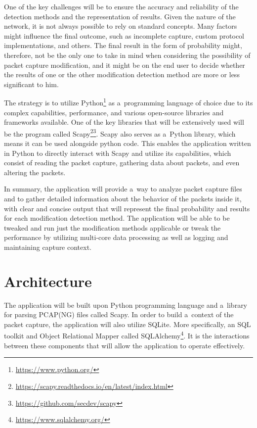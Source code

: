 \documentclass[
  printed,     %
  color,       %
  oneside,     %
  nosansbold,  %
  nocolorbold, %
  nolof,         %
  nolot,         %
]{fithesis4}
\begin{document}
One of the key challenges will be to ensure the accuracy and reliability of the detection methods and the representation of results. Given the nature of the network, it is not always possible to rely on standard concepts. Many factors might influence the final outcome, such as incomplete capture, custom protocol implementations, and others. The final result in the form of probability might, therefore, not be the only one to take in mind when considering the possibility of packet capture modification, and it might be on the end user to decide whether the results of one or the other modification detection method are more or less significant to him.

The strategy is to utilize Python\footnote{\url{https://www.python.org/}} as a~programming language of choice due to its complex capabilities, performance, and various open-source libraries and frameworks available. One of the key libraries that will be extensively used will be the program called Scapy\footnote{\url{https://scapy.readthedocs.io/en/latest/index.html}}\footnote{\url{https://github.com/secdev/scapy}}. Scapy also serves as a~Python library, which means it can be used alongside python code. This enables the application written in Python to directly interact with Scapy and utilize its capabilities, which consist of reading the packet capture, gathering data about packets, and even altering the packets. 

In summary, the application will provide a~way to analyze packet capture files and to gather detailed information about the behavior of the packets inside it, with clear and concise output that will represent the final probability and results for each modification detection method. The application will be able to be tweaked and run just the modification methods applicable or tweak the performance by utilizing multi-core data processing as well as logging and maintaining capture context.

\section{Architecture}

The application will be built upon Python programming language and a~library for parsing PCAP(NG) files called Scapy. In order to build a~context of the packet capture, the application will also utilize SQLite. More specifically, an SQL toolkit and Object Relational Mapper called SQLAlchemy\footnote{\url{https://www.sqlalchemy.org/}}. It is the interactions between these components that will allow the application to operate effectively.
\end{document}
